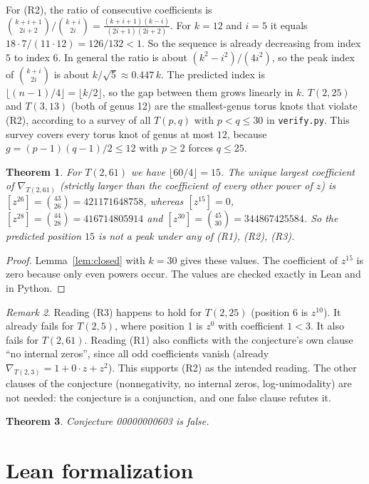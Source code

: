 \documentclass[11pt]{article}
\newtheorem{theorem}{Theorem}
\theoremstyle{definition}
\theoremstyle{remark}
\newtheorem{remark}[theorem]{Remark}
\begin{document}
For (R2), the ratio of consecutive coefficients is
$\binom{k+i+1}{2i+2}\big/\binom{k+i}{2i}=\frac{(k+i+1)(k-i)}{(2i+1)(2i+2)}$.
For $k=12$ and $i=5$ it equals $18\cdot 7/(11\cdot 12)=126/132<1$. So the
sequence is already decreasing from index $5$ to index $6$. In general the
ratio is about $(k^2-i^2)/(4i^2)$, so the peak index of $\binom{k+i}{2i}$ is
about $k/\sqrt5\approx 0.447\,k$. The predicted index is
$\lfloor (n-1)/4\rfloor=\lfloor k/2\rfloor$, so the gap between them grows
linearly in $k$. $T(2,25)$ and $T(3,13)$ (both of genus 12) are the
smallest-genus torus knots that violate (R2), according to a survey of all
$T(p,q)$ with $p<q\le 30$ in \texttt{verify.py}. This survey covers every torus
knot of genus at most $12$, because $g=(p-1)(q-1)/2\le 12$ with $p\ge2$ forces
$q\le 25$.

\begin{theorem}\label{thm:61}
For $T(2,61)$ we have $\lfloor 60/4\rfloor=15$. The unique largest coefficient of
$\nabla_{T(2,61)}$ (strictly larger than the coefficient of every other power of $z$) is $[z^{26}]=\binom{43}{26}=421171648758$, whereas
$[z^{15}]=0$, $[z^{28}]=\binom{44}{28}=416714805914$ and
$[z^{30}]=\binom{45}{30}=344867425584$. So the predicted position $15$ is not
a peak under any of (R1), (R2), (R3).
\end{theorem}
\begin{proof}
Lemma~\ref{lem:closed} with $k=30$ gives these values. The coefficient of
$z^{15}$ is zero because only even powers occur. The values are checked
exactly in Lean and in Python.
\end{proof}

\begin{remark}
Reading (R3) happens to hold for $T(2,25)$ (position 6 is $z^{10}$). It
already fails for $T(2,5)$, where position 1 is $z^0$ with coefficient
$1<3$. It also fails for $T(2,61)$. Reading (R1) also conflicts with the
conjecture's own clause ``no internal zeros'', since all odd coefficients vanish
(already $\nabla_{T(2,3)}=1+0\cdot z+z^2$). This supports (R2) as the intended
reading. The other clauses of the conjecture
(nonnegativity, no internal zeros, log-unimodality) are not needed: the conjecture is a
conjunction, and one false clause refutes it.
\end{remark}

\begin{theorem}
Conjecture 00000000603 is false.
\end{theorem}

\section{Lean formalization}
\end{document}

